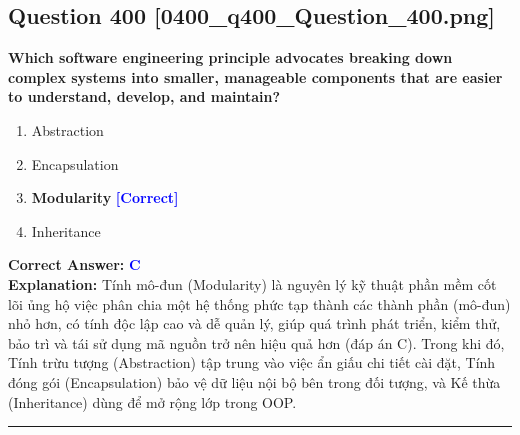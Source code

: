 \documentclass[11pt,a4paper]{article}
\begin{document}
\begin{minipage}{\textwidth}
\subsection*{Question 400 \quad \footnotesize{[0400\_q400\_Question\_400.png]}}
\noindent \textbf{Which software engineering principle advocates breaking down complex systems into smaller, manageable components that are easier to understand, develop, and maintain?}

\begin{enumerate}[label=\Alph*.]
    \item Abstraction
    \item Encapsulation
    \item \textbf{Modularity} \hfill \textcolor{blue}{\textbf{[Correct]}}
    \item Inheritance
\end{enumerate}

\noindent \textbf{Correct Answer:} \textcolor{blue}{\textbf{C}} \\[2pt]
\noindent \textbf{Explanation:} Tính mô-đun (Modularity) là nguyên lý kỹ thuật phần mềm cốt lõi ủng hộ việc phân chia một hệ thống phức tạp thành các thành phần (mô-đun) nhỏ hơn, có tính độc lập cao và dễ quản lý, giúp quá trình phát triển, kiểm thử, bảo trì và tái sử dụng mã nguồn trở nên hiệu quả hơn (đáp án C). Trong khi đó, Tính trừu tượng (Abstraction) tập trung vào việc ẩn giấu chi tiết cài đặt, Tính đóng gói (Encapsulation) bảo vệ dữ liệu nội bộ bên trong đối tượng, và Kế thừa (Inheritance) dùng để mở rộng lớp trong OOP.

\par\vspace{0.3cm}
\hrule
\vspace{0.3cm}
\end{minipage}
\end{document}
